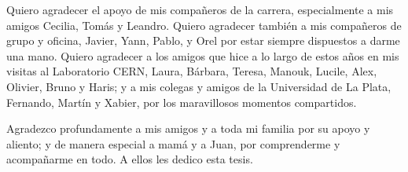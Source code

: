 \documentclass[11pt,a4paper,12pt]{report}
\begin{document}
Quiero agradecer el apoyo de mis compa\~neros de la carrera, especialmente a mis amigos Cecilia, Tom\'as y Leandro. Quiero agradecer tambi\'en a mis  compa\~neros de grupo y oficina, Javier, Yann, Pablo, y Orel por estar siempre dispuestos a darme una mano.  Quiero agradecer a los amigos que hice a lo largo de estos a\~nos en mis visitas al Laboratorio CERN, Laura, B\'arbara, Teresa, Manouk, Lucile, Alex, Olivier, Bruno y Haris; y a mis colegas y amigos de la Universidad de La Plata, Fernando, Mart\'in y Xabier, por los maravillosos momentos compartidos.

Agradezco profundamente a mis amigos y a toda mi familia por su apoyo y aliento; y de manera especial a mam\'a y a Juan, por comprenderme y acompa\~narme en todo. A ellos les dedico esta tesis. %




\end{document}
